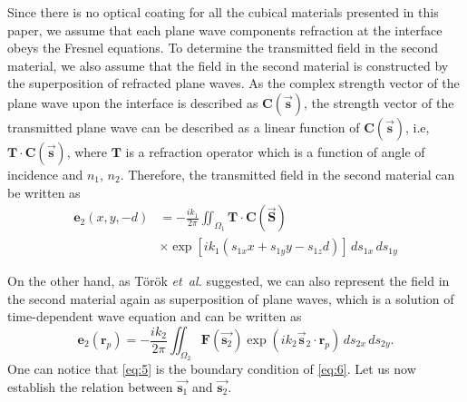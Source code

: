 \documentclass[9pt,twocolumn,twoside]{osajnl}
\begin{document}
Since there is no optical coating for all the cubical materials presented in this paper, we assume that each plane wave components refraction at the interface obeys the Fresnel equations. To determine the transmitted field in the second material, we also assume that the field in the second material is constructed by the superposition of refracted plane waves. As the complex strength vector of the plane wave upon the interface is described as $\textbf{C}(\vec{\textbf{s}})$, the strength vector of the transmitted plane wave can be described as a linear function of $\textbf{C}(\vec{\textbf{s}})$, i.e, $\textbf{T}\cdot\textbf{C}(\vec{\textbf{s}})$, where $\mathbf{T}$ is a refraction operator which is a function of angle of incidence and $n_1$, $n_2$. Therefore, the transmitted field in the second material can be written as
\begin{equation}\label{eq:5}
	\begin{aligned}
		\textbf{e}_2(x,y,-d)&=-\frac{ik_1}{2\pi}\iint_{\Omega_1}\textbf{T}\cdot\textbf{C}(\vec{\textbf{S}})\\
		&\times\exp[ik_1(s_{1x}x+s_{1y}y-s_{1z}d)]\,ds_{1x}\,ds_{1y}		
	\end{aligned}
\end{equation}

On the other hand, as T\"or\"ok \emph{et~al.} \cite{torok1995electromagnetic} suggested, we can also represent the field in the second material again as superposition of plane waves, which is a solution of time-dependent wave equation and can be written as
\begin{equation}\label{eq:6}
	\textbf{e}_2(\textbf{r}_p)=-\frac{ik_2}{2\pi}\iint_{\Omega_2}\textbf{F}(\vec{\mathbf{s}_2})\exp(ik_2\vec{\textbf{s}}_2\cdot\mathbf{r}_p)\,ds_{2x}\,ds_{2y}.
\end{equation}
One can notice that \eqref{eq:5} is the boundary condition of \eqref{eq:6}. Let us now establish the relation between $\vec{\textbf{s}_1}$ and $\vec{\textbf{s}_2}$.
\end{document}

